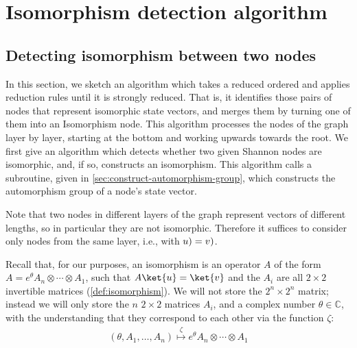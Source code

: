 \section{Isomorphism detection algorithm}
\label{sec:isomorphism-finding-torus}

\subsection{Detecting isomorphism between two \textsf{\limdd} nodes}
\label{sec:isomorphism-finding-detailed}

In this section, we sketch an algorithm which takes a reduced ordered \textsf{\limdd} and applies reduction rules until it is strongly reduced.
That is, it identifies those pairs of nodes that represent isomorphic state vectors, and merges them by turning one of them into an Isomorphism node.
This algorithm processes the nodes of the graph layer by layer, starting at the bottom and working upwards towards the root.
We first give an algorithm which detects whether two given Shannon nodes are isomorphic, and, if so, constructs an isomorphism.
This algorithm calls a subroutine, given in \autoref{sec:construct-automorphism-group}, which constructs the automorphism group of a node's state vector.

Note that two nodes in different layers of the graph represent vectors of different lengths, so in particular they are not isomorphic.
Therefore it suffices to consider only nodes from the same layer, i.e., with $\index(u)=\index(v)$.

Recall that, for our purposes, an isomorphism is an operator $A$ of the form $A=e^\theta A_n\otimes \cdots\otimes A_1$, such that $A\ket{u}=\ket{v}$ and the $A_i$ are all $2\times 2$ invertible matrices (\autoref{def:isomorphism}).
We will not store the $2^n\times 2^n$ matrix; instead we will only store the $n$ $2\times 2$ matrices $A_i$, and a complex number $\theta\in\mathbb C$, with the understanding that they correspond to each other via the function $\zeta$:
\begin{align}
(\theta,A_1,\ldots, A_n) \overset{\zeta}{\mapsto}e^\theta A_n\otimes\cdots\otimes A_1
\end{align}

